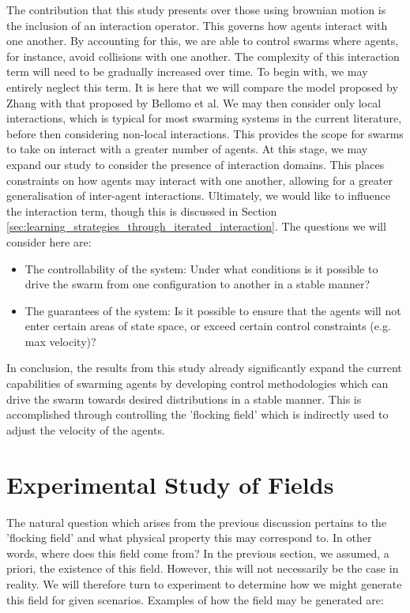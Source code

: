 \documentclass[../sample.tex]{subfiles}
\begin{document}
	The contribution that this study presents over those using brownian motion is the inclusion of an
	interaction operator. This governs how agents interact with one another. By accounting for this, we
	are able to control swarms where agents, for instance, avoid collisions with one another. The
	complexity of this interaction term will need to be gradually increased over time. To begin with,
	we may entirely neglect this term. It is here that we will compare the model proposed by Zhang with
	that proposed by Bellomo et al. We may then consider only local interactions, which is typical for
	most swarming systems in the current literature, before then considering non-local interactions.
	This provides the scope for swarms to take on interact with a greater number of agents. At this
	stage, we may expand our study to consider the presence of interaction domains. This places
	constraints on how agents may interact with one another, allowing for a greater generalisation of
	inter-agent interactions. Ultimately, we would like to influence the interaction term, though this
	is discussed in Section \ref{sec:learning_strategies_through_iterated_interaction}. The questions
	we will consider here are:

	\begin{itemize}
		\item The controllability of the system: Under what conditions is it possible to drive the
		swarm from one configuration to another in a stable manner?
		\item The guarantees of the system: Is it possible to ensure that the agents will not enter
		certain areas of state space, or exceed certain control constraints (e.g. max velocity)?
	\end{itemize}

	In conclusion, the results from this study already significantly expand the current capabilities of
	swarming agents by developing control methodologies which can drive the swarm towards desired
	distributions in a stable manner. This is accomplished through controlling the 'flocking field'
	which is indirectly used to adjust the velocity of the agents.

	
	\section{Experimental Study of Fields} %
	\label{sec:experimental_study_of_fields}
	
	The natural question which arises from the previous discussion pertains to the 'flocking field' and
	what physical property this may correspond to. In other words, where does this field come from? In
	the previous section, we assumed, a priori, the existence of this field. However, this will not
	necessarily be the case in reality. We will therefore turn to experiment to determine how we might
	generate this field for given scenarios. Examples of how the field may be generated are:
\end{document}
